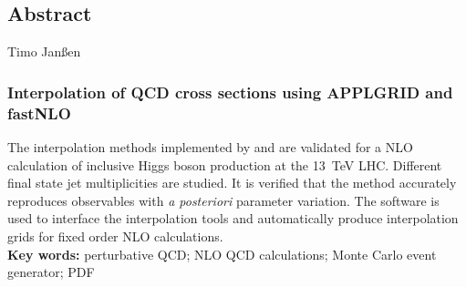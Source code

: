 
%
%
%
\subsection*{Abstract}

Timo Janßen
\subsubsection*{Interpolation of QCD cross sections using APPLGRID and fastNLO}
The interpolation methods implemented by \appl{} and \fnlo{} are validated for a NLO calculation of inclusive Higgs boson production at the \SI{13}{\tera\electronvolt} LHC.
Different final state jet multiplicities are studied. 
It is verified that the method accurately reproduces observables with \textit{a posteriori} parameter variation.
The \mcgrid{} software is used to interface the interpolation tools and automatically produce interpolation grids for fixed order NLO calculations.
%
\mbox{}\\[0.5\baselineskip]\noindent
\textbf{Key words:} 
perturbative QCD; NLO QCD calculations; Monte Carlo event generator; PDF
